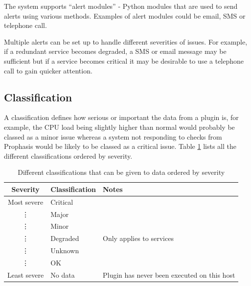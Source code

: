 \documentclass[bsc,deptreport,twoside,parskip,singlespacing,notimes]{infthesis}
\begin{document}
	The system supports ``alert modules'' - Python modules that are used to send
	alerts using various methods.  Examples of alert modules could be email, SMS or
	telephone call.


	Multiple alerts can be set up to handle different severities of issues.  For
	example, if a redundant service becomes degraded, a SMS or email message may be
	sufficient but if a service becomes critical it may be desirable to use a
	telephone call to gain quicker attention.

\subsection{Classification}
	A classification defines how serious or important the data from a plugin is,
	for example, the CPU load being slightly higher than normal would probably be
	classed as a minor issue whereas a system not responding to checks from
	Prophasis would be likely to be classed as a critical issue. Table
	\ref{table-classifications} lists all the different classifications ordered
	by severity.

\begin{table}[H]
	\centering
	\caption{Different classifications that can be given to data ordered by severity}
	\label{table-classifications}
    \begin{tabular}{|c|l|l|}
    \hline
    Severity     & Classification & Notes                                       \\ \hline
    Most severe  & Critical       & ~                                           \\
    \vdots       & Major          & ~                                           \\
    \vdots       & Minor          & ~                                           \\
    \vdots       & Degraded       & Only applies to services                    \\
    \vdots       & Unknown        & ~                                           \\
    \vdots       & OK             & ~                                           \\
    Least severe & No data        & Plugin has never been executed on this host \\ \hline
    \end{tabular}
\end{table}
\end{document}
